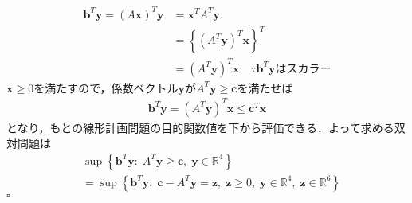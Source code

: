 \documentclass[a4j,uplatex]{jsarticle}
\theoremstyle{definition}
\begin{document}
\begin{align*}
    \boldsymbol{b}^T\boldsymbol{y}=(A\boldsymbol{x})^T\boldsymbol{y} & =\boldsymbol{x}^TA^T\boldsymbol{y}                                                             \\
                                                                     & =\left\{(A^T\boldsymbol{y})^T\boldsymbol{x}\right\}^T                                          \\
                                                                     & =(A^T\boldsymbol{y})^T\boldsymbol{x} \quad \because \boldsymbol{b}^T\boldsymbol{y}\text{はスカラー}
\end{align*}
$\boldsymbol{x}\geq0$を満たすので，係数ベクトル$\boldsymbol{y}$が$A^T\boldsymbol{y}\geq \boldsymbol{c}$を満たせば
\begin{align*}
    \boldsymbol{b}^T\boldsymbol{y}=(A^T\boldsymbol{y})^T\boldsymbol{x}\leq \boldsymbol{c}^T\boldsymbol{x}
\end{align*}
となり，もとの線形計画問題の目的関数値を下から評価できる．よって求める双対問題は
\begin{align*}
     & \sup \left\{\boldsymbol{b}^T\boldsymbol{y}:\; A^T\boldsymbol{y}\geq \boldsymbol{c},\; \boldsymbol{y}\in\mathbb{R}^4\right\}                                                                              \\
     & =\sup \left\{\boldsymbol{b}^T\boldsymbol{y}:\; \boldsymbol{c}-A^T\boldsymbol{y}=\boldsymbol{z} ,\; \boldsymbol{z}\geq 0,\; \boldsymbol{y}\in\mathbb{R}^4,\; \boldsymbol{z}\in\mathbb{R}^6\right\}\tag{3}
\end{align*}$\square$
\end{document}
